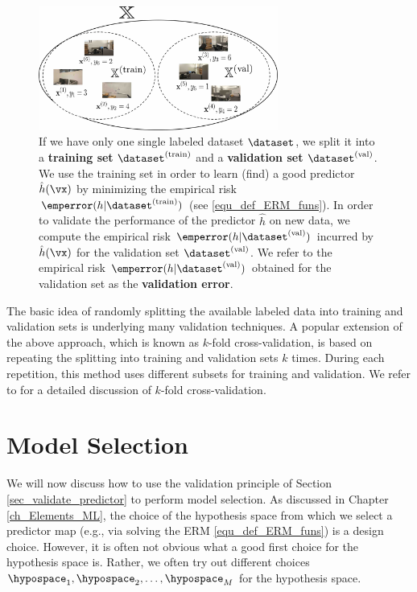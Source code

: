 \documentclass[12pt]{report}
\begin{document}
 \begin{figure}[htbp]
    \centering
   \includegraphics[width=0.7\textwidth]{TrainValSmall.jpg}  
    \caption{If we have only one single labeled dataset $\dataset$, we split it into a {\bf training set} $\dataset^{(\rm train)}$ 
    and a {\bf validation set} $\dataset^{(\rm val)}$. We use the training set in order to learn (find) a good predictor $\hat{h}(\vx)$ 
    by minimizing the empirical risk $\emperror(h| \dataset^{(\rm train)})$ (see \eqref{equ_def_ERM_funs}). 
    In order to validate the performance of the predictor $\hat{h}$ on new data, we compute the empirical risk 
    $\emperror(h| \dataset^{(\rm val)})$ incurred by $\hat{h}(\vx)$ for the validation set $\dataset^{(\rm val)}$. 
    We refer to the empirical risk $\emperror(h| \dataset^{(\rm val)})$ obtained for the validation set as the {\bf validation error}.}
    \label{fig_split_train_val}
\end{figure}

The basic idea of randomly splitting the available labeled data into training and 
validation sets is underlying many validation techniques. A popular extension 
of the above approach, which is known as $k$-fold cross-validation, is based 
on repeating the splitting into training and validation sets $k$ times. During 
each repetition, this method uses different subsets for training and validation. 
We refer to \cite[Sec. 7.10]{hastie01statisticallearning} for a detailed discussion of $k$-fold 
cross-validation. 

\section{Model Selection}
\label{sec_modsel}

We will now discuss how to use the validation principle of Section \ref{sec_validate_predictor} to perform model selection. 
As discussed in Chapter \ref{ch_Elements_ML}, the choice of the hypothesis space from which 
we select a predictor map (e.g., via solving the ERM \eqref{equ_def_ERM_funs}) is a design choice. 
However, it is often not obvious what a good first choice for the hypothesis space is. Rather, we often try out 
different choices $\hypospace_{1},\hypospace_{2},\ldots,\hypospace_{M}$ for the hypothesis space. 
\end{document}
